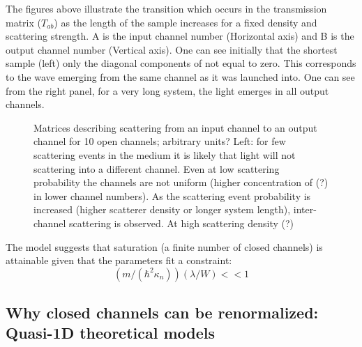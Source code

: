 The figures above illustrate the transition which occurs in the transmission
matrix ($T_{ab}$) as the length of the sample increases for a fixed density and
scattering strength.  A is the input channel number (Horizontal axis) and B is
the output channel number (Vertical axis).  One can see initially that the
shortest sample (left) only the diagonal components of not equal to zero.
This corresponds to the wave emerging from the same channel as it was launched
into.  One can see from the right panel, for a very long system, the light
emerges in all output channels.

\begin{figure}
\vskip -0.5cm
\centerline{
}
\vskip -0.5cm
\caption{Matrices describing scattering from an input channel to an output channel
for 10 open channels; arbitrary units?  Left: for few scattering events in the 
medium it is likely that light will not scattering into a different channel. Even
at low scattering probability the channels are not uniform (higher concentration
of (?) in lower channel numbers). As the scattering event probability is increased
(higher scatterer density or longer system length), inter-channel scattering is 
observed.  At high scattering density (?)}
\label{fig:channelMatrices}
\end{figure}


The model suggests that saturation (a finite number of closed 
channels) is attainable given that the parameters fit a constraint:
\begin{equation}
(m / (\hbar^2 \kappa _n))(\lambda/W) <<1
\end{equation}



\subsection {Why closed channels can be renormalized: Quasi-1D theoretical models}

